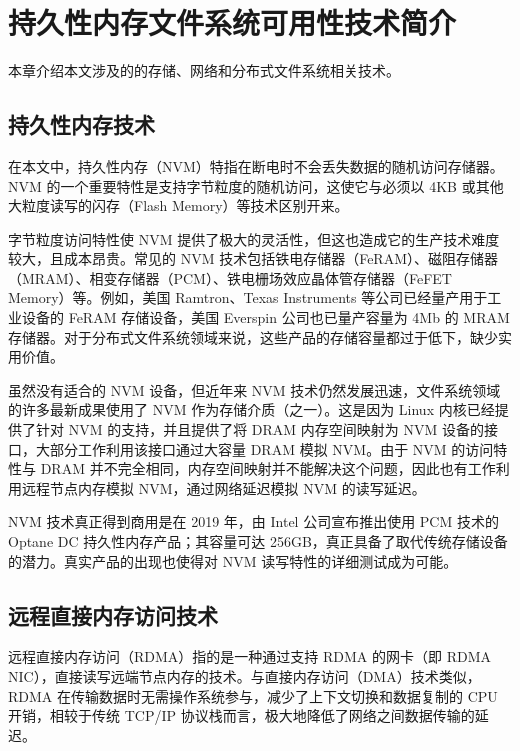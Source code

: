 
\chapter{持久性内存文件系统可用性技术简介}
\label{cha:tech}


本章介绍本文涉及的的存储、网络和分布式文件系统相关技术。

\section{持久性内存技术}
\label{sec:ch2_nvm}

在本文中，持久性内存（NVM）特指在断电时不会丢失数据的随机访问存储器。NVM 的一个重要特性是支持字节粒度的随机访问，这使它与必须以 4KB 或其他大粒度读写的闪存（Flash Memory）等技术区别开来。

字节粒度访问特性使 NVM 提供了极大的灵活性，但这也造成它的生产技术难度较大，且成本昂贵。常见的 NVM 技术包括铁电存储器（FeRAM）、磁阻存储器（MRAM）、相变存储器（PCM）、铁电栅场效应晶体管存储器（FeFET Memory）等。例如，美国 Ramtron、Texas Instruments 等公司已经量产用于工业设备的 FeRAM 存储设备，美国 Everspin 公司也已量产容量为 4Mb 的 MRAM 存储器。对于分布式文件系统领域来说，这些产品的存储容量都过于低下，缺少实用价值。

虽然没有适合的 NVM 设备，但近年来 NVM 技术仍然发展迅速，文件系统领域的许多最新成果使用了 NVM 作为存储介质（之一）。这是因为 Linux 内核已经提供了针对 NVM 的支持，并且提供了将 DRAM 内存空间映射为 NVM 设备的接口，大部分工作利用该接口通过大容量 DRAM 模拟 NVM。由于 NVM 的访问特性与 DRAM 并不完全相同，内存空间映射并不能解决这个问题，因此也有工作\cite{gogtewear2019}利用远程节点内存模拟 NVM，通过网络延迟模拟 NVM 的读写延迟。  

NVM 技术真正得到商用是在 2019 年，由 Intel 公司宣布推出使用 PCM 技术的 Optane DC 持久性内存产品；其容量可达 256GB，真正具备了取代传统存储设备的潜力。真实产品的出现也使得对 NVM 读写特性的详细测试成为可能。

\section{远程直接内存访问技术}
\label{sec:ch2_rdma}

远程直接内存访问（RDMA）指的是一种通过支持 RDMA 的网卡（即 RDMA NIC），直接读写远端节点内存的技术。与直接内存访问（DMA）技术类似，RDMA 在传输数据时无需操作系统参与，减少了上下文切换和数据复制的 CPU 开销，相较于传统 TCP/IP 协议栈而言，极大地降低了网络之间数据传输的延迟。

